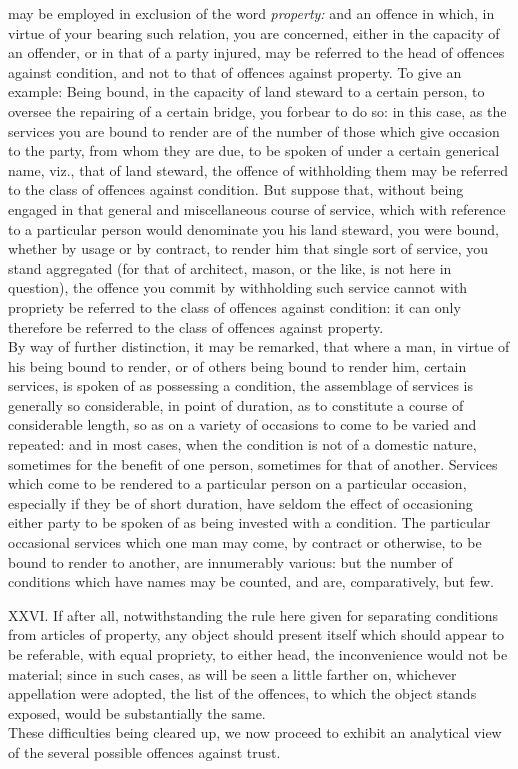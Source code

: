 \documentclass[12pt]{report}
\begin{document}
may be employed in exclusion of the word \emph{property:} and an offence
in which, in virtue of your bearing such relation, you are concerned,
either in the capacity of an offender, or in that of a party injured,
may be referred to the head of offences against condition, and not to
that of offences against property. To give an example: Being bound, in
the capacity of land steward to a certain person, to oversee the
repairing of a certain bridge, you forbear to do so: in this case, as
the services you are bound to render are of the number of those which
give occasion to the party, from whom they are due, to be spoken of
under a certain generical name, viz., that of land steward, the offence
of withholding them may be referred to the class of offences against
condition. But suppose that, without being engaged in that general and
miscellaneous course of service, which with reference to a particular
person would denominate you his land steward, you were bound, whether by
usage or by contract, to render him that single sort of service, you
stand aggregated (for that of architect, mason, or the like, is not here
in question), the offence you commit by withholding such service cannot
with propriety be referred to the class of offences against condition:
it can only therefore be referred to the class of offences against
property.\\
By way of further distinction, it may be remarked, that where a man, in
virtue of his being bound to render, or of others being bound to render
him, certain services, is spoken of as possessing a condition, the
assemblage of services is generally so considerable, in point of
duration, as to constitute a course of considerable length, so as on a
variety of occasions to come to be varied and repeated: and in most
cases, when the condition is not of a domestic nature, sometimes for the
benefit of one person, sometimes for that of another. Services which
come to be rendered to a particular person on a particular occasion,
especially if they be of short duration, have seldom the effect of
occasioning either party to be spoken of as being invested with a
condition. The particular occasional services which one man may come, by
contract or otherwise, to be bound to render to another, are innumerably
various: but the number of conditions which have names may be counted,
and are, comparatively, but few.

XXVI. If after all, notwithstanding the rule here given for separating
conditions from articles of property, any object should present itself
which should appear to be referable, with equal propriety, to either
head, the inconvenience would not be material; since in such cases, as
will be seen a little farther on, whichever appellation were adopted,
the list of the offences, to which the object stands exposed, would be
substantially the same.\\
These difficulties being cleared up, we now proceed to exhibit an
analytical view of the several possible offences against trust.
\end{document}
